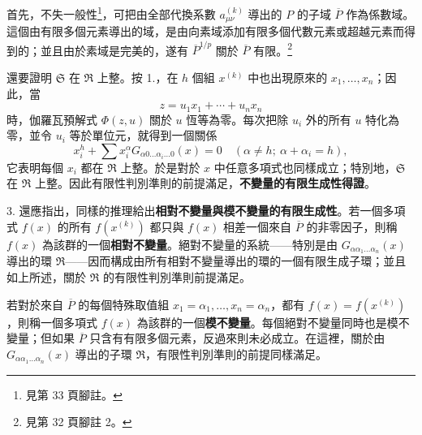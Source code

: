 \documentclass[11pt]{article}
\newcommand{\srcemph}[1]{\textbf{#1}}
\begin{document}
首先，不失一般性\footnote{見第 33 頁腳註。}，可把由全部代換系數 $a_{\mu\nu}^{(k)}$ 導出的 $P$ 的子域 $\overline P$ 作為係數域。這個由有限多個元素導出的域，是由向素域添加有限多個代數元素或超越元素而得到的；並且由於素域是完美的，遂有 $\overline P^{1/p}$ 關於 $\overline P$ 有限。\footnote{見第 32 頁腳註 2。}

還要證明 $\mathfrak S$ 在 $\mathfrak R$ 上整。按 1.，在 $h$ 個組 $x^{(k)}$ 中也出現原來的 $x_1,\ldots,x_n$；因此，當
\[
 z=u_1x_1+\cdots+u_nx_n
\]
時，伽羅瓦預解式 $\Phi(z,u)$ 關於 $u$ 恆等為零。每次把除 $u_i$ 外的所有 $u$ 特化為零，並令 $u_i$ 等於單位元，就得到一個關係
\[
 x_i^h+\sum x_i^\alpha G_{\alpha0\ldots\alpha_i\ldots0}(x)=0
 \quad (\alpha\ne h;\ \alpha+\alpha_i=h),
\]
它表明每個 $x_i$ 都在 $\mathfrak R$ 上整。於是對於 $x$ 中任意多項式也同樣成立；特別地，$\mathfrak S$ 在 $\mathfrak R$ 上整。因此有限性判別準則的前提滿足，\srcemph{不變量的有限生成性得證}。

3. 還應指出，同樣的推理給出\srcemph{相對不變量與模不變量的有限生成性}。若一個多項式 $f(x)$ 的所有 $f(x^{(k)})$ 都只與 $f(x)$ 相差一個來自 $\overline P$ 的非零因子，則稱 $f(x)$ 為該群的一個\srcemph{相對不變量}。絕對不變量的系統——特別是由 $G_{\alpha\alpha_1\ldots\alpha_n}(x)$ 導出的環 $\mathfrak R$——因而構成由所有相對不變量導出的環的一個有限生成子環；並且如上所述，關於 $\mathfrak R$ 的有限性判別準則前提滿足。

若對於來自 $\overline P$ 的每個特殊取值組 $x_1=\alpha_1,\ldots,x_n=\alpha_n$，都有 $f(x)=f(x^{(k)})$，則稱一個多項式 $f(x)$ 為該群的一個\srcemph{模不變量}。每個絕對不變量同時也是模不變量；但如果 $\overline P$ 只含有有限多個元素，反過來則未必成立。在這裡，關於由 $G_{\alpha\alpha_1\ldots\alpha_n}(x)$ 導出的子環 $\mathfrak R$，有限性判別準則的前提同樣滿足。
\end{document}
